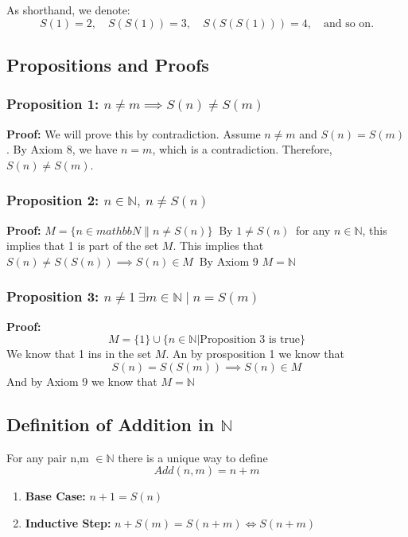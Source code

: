 As shorthand, we denote:
\[
	S(1) = 2, \quad S(S(1)) = 3, \quad S(S(S(1))) = 4, \quad \text{and so on.}
\]

\subsection{Propositions and Proofs}

\subsubsection{Proposition 1: \texorpdfstring{$n \ne m \implies S(n) \ne S(m)$}{n!= m implies S (n)!=S (m)}}
\textbf{Proof:} We will prove this by contradiction. Assume \( n \ne m \) and \( S(n) = S(m) \). By Axiom 8, we have \( n = m \), which is a contradiction. Therefore, \( S(n) \ne S(m) \).

\subsubsection{Proposition 2: \texorpdfstring{ \(n \in \mathbb{N},\ n \ne S(n)\)}{For any n in N, n!= S (n)}}
\textbf{Proof:} $M = \{n \in mathbb{N} \| n \ne S(n) \}\ $
By $1 \ne S(n)\ $ for any $n \in \mathbb{N}$, this implies that 1 is part of the set $M$. This implies that $S(n) \ne S(S(n)) \implies S(n) \in M\ $ By Axiom 9 $M = \mathbb{N}$

\subsubsection{Proposition 3: \texorpdfstring{$n \ne 1\ \exists m \in \mathbb{N} \mid n = S(m)$}{n!= 1, exists m in N | n = S (m)}}
\textbf{Proof:}
\[
	M = \{1\} \cup\{n \in \mathbb{N} | \text{Proposition 3 is true}\}
\]
We know that 1 ins in the set $M$. An by prosposition 1 we know that
\[
	S(n) = S(S(m)) \implies S(n) \in M
\]
And by Axiom 9 we know that $M = \mathbb{N}$

\subsection{Definition of Addition in \texorpdfstring{$\mathbb{N}$}{}}

For any pair n,m $\in \mathbb{N}$ there is a unique way to define
\[
	Add(n , m) = n + m
\]
\begin{enumerate}
	\item \textbf{Base Case:} $n + 1 = S(n)$
	\item \textbf{Inductive Step:} $n + S(m) = S(n + m) \iff S(n + m)$
\end{enumerate}

